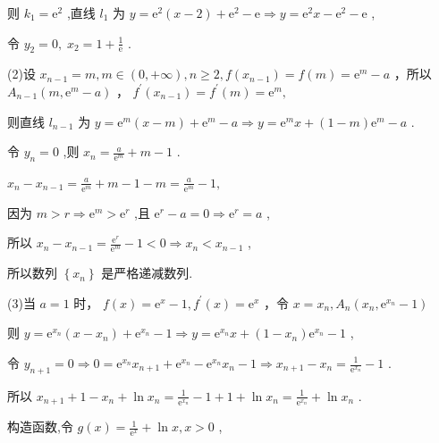 \documentclass[10pt]{article}
\begin{document}
则 \({k}_{1} = {\mathrm{e}}^{2}\) ,直线 \({l}_{1}\) 为 \(y = {\mathrm{e}}^{2}\left( {x - 2}\right)  + {\mathrm{e}}^{2} - \mathrm{e} \Rightarrow  y = {\mathrm{e}}^{2}x - {\mathrm{e}}^{2} - \mathrm{e}\) ,

令 \({y}_{2} = 0,\;{x}_{2} = 1 + \frac{1}{\mathrm{e}}\) .

(2)设 \({x}_{n - 1} = m,m \in  \left( {0, + \infty }\right) ,n \geq  2,f\left( {x}_{n - 1}\right)  = f\left( m\right)  = {\mathrm{e}}^{m} - a\) ，所以 \({A}_{n - 1}\left( {m,{\mathrm{e}}^{m} - a}\right)\) ， \({f}^{\prime }\left( {x}_{n - 1}\right)  = {f}^{\prime }\left( m\right)  = {\mathrm{e}}^{m},\)

则直线 \({l}_{n - 1}\) 为 \(y = {\mathrm{e}}^{m}\left( {x - m}\right)  + {\mathrm{e}}^{m} - a \Rightarrow  y = {\mathrm{e}}^{m}x + \left( {1 - m}\right) {\mathrm{e}}^{m} - a\) .

令 \({y}_{n} = 0\) ,则 \({x}_{n} = \frac{a}{{\mathrm{e}}^{m}} + m - 1\) .

\({x}_{n} - {x}_{n - 1} = \frac{a}{{\mathrm{e}}^{m}} + m - 1 - m = \frac{a}{{\mathrm{e}}^{m}} - 1,\)

因为 \(m > r \Rightarrow  {\mathrm{e}}^{m} > {\mathrm{e}}^{r}\) ,且 \({\mathrm{e}}^{r} - a = 0 \Rightarrow  {\mathrm{e}}^{r} = a\) ,

所以 \({x}_{n} - {x}_{n - 1} = \frac{{\mathrm{e}}^{r}}{{\mathrm{e}}^{m}} - 1 < 0 \Rightarrow  {x}_{n} < {x}_{n - 1}\) ,

所以数列 \(\left\{  {x}_{n}\right\}\) 是严格递减数列.

(3)当 \(a = 1\) 时， \(f\left( x\right)  = {\mathrm{e}}^{x} - 1,{f}^{\prime }\left( x\right)  = {\mathrm{e}}^{x}\) ，令 \(x = {x}_{n},{A}_{n}\left( {{x}_{n},{\mathrm{e}}^{{x}_{n}} - 1}\right)\)

则 \(y = {\mathrm{e}}^{{x}_{n}}\left( {x - {x}_{n}}\right)  + {\mathrm{e}}^{{x}_{n}} - 1 \Rightarrow  y = {\mathrm{e}}^{{x}_{n}}x + \left( {1 - {x}_{n}}\right) {\mathrm{e}}^{{x}_{n}} - 1\) ,

令 \({y}_{n + 1} = 0 \Rightarrow  0 = {\mathrm{e}}^{{x}_{n}}{x}_{n + 1} + {\mathrm{e}}^{{x}_{n}} - {\mathrm{e}}^{{x}_{n}}{x}_{n} - 1 \Rightarrow  {x}_{n + 1} - {x}_{n} = \frac{1}{{\mathrm{e}}^{{x}_{n}}} - 1\) .

所以 \({x}_{n + 1} + 1 - {x}_{n} + \ln {x}_{n} = \frac{1}{{\mathrm{e}}^{{x}_{n}}} - 1 + 1 + \ln {x}_{n} = \frac{1}{{\mathrm{e}}^{{x}_{n}}} + \ln {x}_{n}\) .

构造函数,令 \(g\left( x\right)  = \frac{1}{{\mathrm{e}}^{x}} + \ln x,x > 0\) ,
\end{document}
